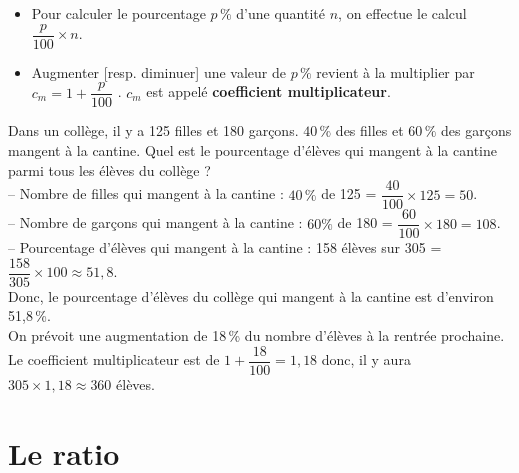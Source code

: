 \medskip

\begin{propriete}
   \begin{itemize}
      \item Pour calculer le pourcentage $p\,\%$ d'une quantité $n$, on effectue le calcul $\dfrac{p}{100}\times n$.
      \item Augmenter [resp. diminuer] une valeur de $p\,\%$ revient à la multiplier par $c_m =1+\dfrac{p}{100}$ \bigg[resp. $c_m =1-\dfrac{p}{100}$\bigg]. $c_m$ est appelé {\bf coefficient multiplicateur}. \\ [-6mm]
   \end{itemize}
\end{propriete}

\begin{exemple*1}
   Dans un collège, il y a 125 filles et 180 garçons. $40\,\%$ des filles et $60\,\%$ des garçons mangent à la cantine. Quel est le pourcentage d'élèves qui mangent à la cantine parmi tous les élèves du collège ? \\
   -- Nombre de filles qui mangent à la cantine : $40\,\%$ de 125 = $\dfrac{40}{100}\times125=50$. \\ [1mm]
   -- Nombre de garçons qui mangent à la cantine : $60\%$ de 180 = $\dfrac{60}{100}\times180=108$. \\
   -- Pourcentage d'élèves qui mangent à la cantine : 158 élèves sur 305 = $\dfrac{158}{305}\times 100\approx51,8$. \\ [1mm]
   Donc, le pourcentage d'élèves du collège qui mangent à la cantine est d'environ 51,8\,\%. \\ [5mm]
       On prévoit une augmentation de 18\,\% du nombre d'élèves à la rentrée prochaine. \\
         Le coefficient multiplicateur est de $1+\dfrac{18}{100} =1,18$ donc, il y aura $305\times1,18\approx 360$ élèves.         
\end{exemple*1}


\section{Le ratio} %

